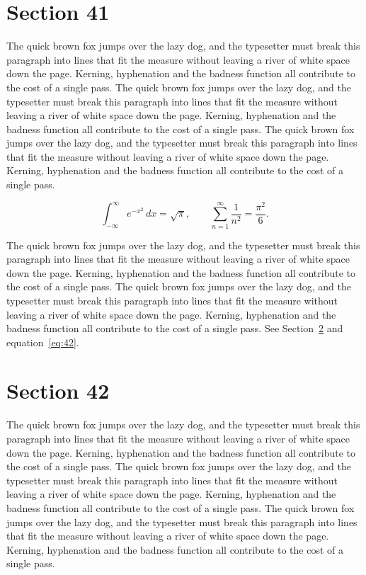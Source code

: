 \documentclass{article}
\begin{document}
\section{Section 41}
\label{sec:41}
The quick brown fox jumps over the lazy dog, and the typesetter must break this paragraph into lines that fit the measure without leaving a river of white space down the page. Kerning, hyphenation and the badness function all contribute to the cost of a single pass. The quick brown fox jumps over the lazy dog, and the typesetter must break this paragraph into lines that fit the measure without leaving a river of white space down the page. Kerning, hyphenation and the badness function all contribute to the cost of a single pass. The quick brown fox jumps over the lazy dog, and the typesetter must break this paragraph into lines that fit the measure without leaving a river of white space down the page. Kerning, hyphenation and the badness function all contribute to the cost of a single pass. 

\begin{equation}\label{eq:41}
\int_{-\infty}^{\infty} e^{-x^{2}}\,dx = \sqrt{\pi}, \qquad
\sum_{n=1}^{\infty} \frac{1}{n^{2}} = \frac{\pi^{2}}{6}.
\end{equation}

The quick brown fox jumps over the lazy dog, and the typesetter must break this paragraph into lines that fit the measure without leaving a river of white space down the page. Kerning, hyphenation and the badness function all contribute to the cost of a single pass. The quick brown fox jumps over the lazy dog, and the typesetter must break this paragraph into lines that fit the measure without leaving a river of white space down the page. Kerning, hyphenation and the badness function all contribute to the cost of a single pass. 
See Section~\ref{sec:42} and equation~\eqref{eq:42}.
\section{Section 42}
\label{sec:42}
The quick brown fox jumps over the lazy dog, and the typesetter must break this paragraph into lines that fit the measure without leaving a river of white space down the page. Kerning, hyphenation and the badness function all contribute to the cost of a single pass. The quick brown fox jumps over the lazy dog, and the typesetter must break this paragraph into lines that fit the measure without leaving a river of white space down the page. Kerning, hyphenation and the badness function all contribute to the cost of a single pass. The quick brown fox jumps over the lazy dog, and the typesetter must break this paragraph into lines that fit the measure without leaving a river of white space down the page. Kerning, hyphenation and the badness function all contribute to the cost of a single pass. 
\end{document}
